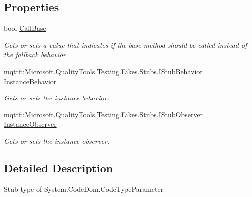 \subsection*{Properties}
\begin{DoxyCompactItemize}
\item 
bool \hyperlink{class_system_1_1_code_dom_1_1_fakes_1_1_stub_code_type_parameter_ae2b53fd2b243bf4cd1ebcfe75697af58}{Call\-Base}
\begin{DoxyCompactList}\small\item\em Gets or sets a value that indicates if the base method should be called instead of the fallback behavior\end{DoxyCompactList}\item 
mqttf\-::\-Microsoft.\-Quality\-Tools.\-Testing.\-Fakes.\-Stubs.\-I\-Stub\-Behavior \hyperlink{class_system_1_1_code_dom_1_1_fakes_1_1_stub_code_type_parameter_a7cbe55c3695852292d333ff5bc5d8174}{Instance\-Behavior}
\begin{DoxyCompactList}\small\item\em Gets or sets the instance behavior.\end{DoxyCompactList}\item 
mqttf\-::\-Microsoft.\-Quality\-Tools.\-Testing.\-Fakes.\-Stubs.\-I\-Stub\-Observer \hyperlink{class_system_1_1_code_dom_1_1_fakes_1_1_stub_code_type_parameter_ab6c7327e393467d1388fa0d4503e0aed}{Instance\-Observer}
\begin{DoxyCompactList}\small\item\em Gets or sets the instance observer.\end{DoxyCompactList}\end{DoxyCompactItemize}


\subsection{Detailed Description}
Stub type of System.\-Code\-Dom.\-Code\-Type\-Parameter



